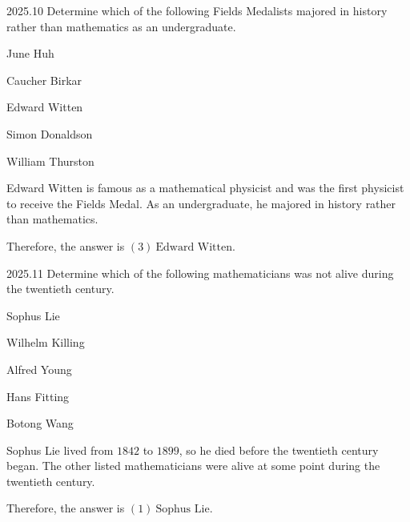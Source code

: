     \begin{pastproblem}{2025.10}
        Determine which of the following Fields Medalists majored in history rather than mathematics
        as an undergraduate.
        \begin{problemchoices}
            \item June Huh
            \item Caucher Birkar
            \item Edward Witten
            \item Simon Donaldson
            \item William Thurston
        \end{problemchoices}
    \end{pastproblem}

    \begin{solution}
        Edward Witten is famous as a mathematical physicist and was the first physicist to receive
        the Fields Medal. As an undergraduate, he majored in history rather than mathematics.

        Therefore, the answer is $\boxed{(3)\ \text{Edward Witten}}$.
    \end{solution}

    \begin{pastproblem}{2025.11}
        Determine which of the following mathematicians was not alive during the twentieth century.
        \begin{problemchoices}
            \item Sophus Lie
            \item Wilhelm Killing
            \item Alfred Young
            \item Hans Fitting
            \item Botong Wang
        \end{problemchoices}
    \end{pastproblem}

    \begin{solution}
        Sophus Lie lived from $1842$ to $1899$, so he died before the twentieth century began. The
        other listed mathematicians were alive at some point during the twentieth century.

        Therefore, the answer is $\boxed{(1)\ \text{Sophus Lie}}$.
    \end{solution}

